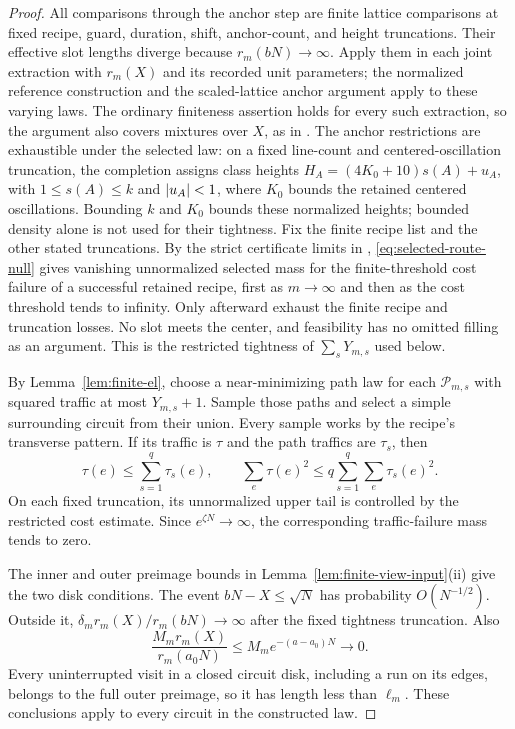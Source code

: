 \begin{proof}
All comparisons through the anchor step are finite lattice
comparisons at fixed recipe, guard, duration, shift, anchor-count,
and height truncations.  Their effective slot lengths diverge
because \(r_m(bN)\to\infty\).  Apply them in each joint extraction
with \(r_m(X)\) and its recorded unit parameters; the normalized
reference construction and the scaled-lattice anchor argument
apply to these varying laws.  The ordinary finiteness assertion
holds for every such extraction, so the argument also covers
mixtures over \(X\), as in \cite[Proposition~7.18]{P}.
The anchor restrictions are exhaustible under the selected law:
on a fixed line-count and centered-oscillation truncation, the
completion assigns class heights
\(H_A=(4K_0+10)s(A)+u_A\), with \(1\le s(A)\le k\) and
\(\lvert u_A\rvert<1\), where \(K_0\) bounds the retained centered
oscillations.  Bounding \(k\) and \(K_0\) bounds these normalized
heights; bounded density alone is not used for their tightness.
Fix the finite recipe list and the other stated truncations.  By the
strict certificate limits in \cite[Lemma~11.27]{P},
\eqref{eq:selected-route-null} gives vanishing unnormalized selected
mass for the finite-threshold cost failure of a successful retained
recipe, first as \(m\to\infty\) and then as the cost threshold tends
to infinity.  Only afterward exhaust the finite recipe and truncation
losses.  No slot meets the center, and feasibility has no omitted
filling as an argument.  This is the restricted tightness of
\(\sum_sY_{m,s}\) used below.

By Lemma~\ref{lem:finite-el}, choose a near-minimizing path law for each \(\mathcal P_{m,s}\)
with squared traffic at most \(Y_{m,s}+1\).  Sample those paths
and select a simple surrounding circuit from their union.
Every sample works by the recipe's transverse pattern.  If its
traffic is \(\tau\) and the path traffics are \(\tau_s\), then
\[
 \tau(e)\le\sum_{s=1}^q\tau_s(e),\qquad
 \sum_e\tau(e)^2\le q\sum_{s=1}^q\sum_e\tau_s(e)^2.
\]
On each fixed truncation, its unnormalized upper tail is controlled
by the restricted cost estimate.  Since \(e^{\zeta N}\to\infty\),
the corresponding traffic-failure mass tends to zero.

The inner and outer preimage bounds in
Lemma~\ref{lem:finite-view-input}(ii) give the two disk
conditions.  The event \(bN-X\le\sqrt N\) has probability
\(O(N^{-1/2})\).  Outside it,
\(\delta_m r_m(X)/r_m(bN)\to\infty\) after the fixed tightness
truncation.  Also
\[
 \frac{M_mr_m(X)}{r_m(a_0N)}
 \le M_m e^{-(a-a_0)N}\longrightarrow0.
\]
Every uninterrupted visit in a closed circuit disk, including
a run on its edges, belongs to the full outer preimage, so it
has length less than \(\ell_m\).  These conclusions apply to
every circuit in the constructed law.


\end{proof}
